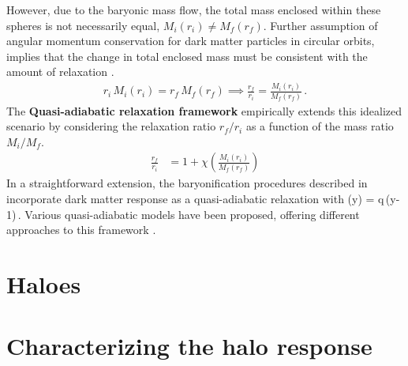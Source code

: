 However, due to the baryonic mass flow, the total mass enclosed within these spheres is not necessarily equal, \( M_i(r_i) \neq M_f(r_f) \). Further assumption of angular momentum conservation for dark matter particles in circular orbits, implies that the change in total enclosed mass must be consistent with the amount of relaxation \citep[][]{1986ApJ...301...27B}.
\begin{align}
    r_i \,M_i(r_i) = r_f \,M_f(r_f) %
    \implies 
    \frac{r_f}{r_i} = \frac{M_i(r_i)}{M_f(r_f)}\,. 
\label{eq:AR}
\end{align}
% 
The \textbf{Quasi-adiabatic relaxation framework} empirically extends this idealized scenario by considering the relaxation ratio \( r_f/r_i \) as a function of the mass ratio \( M_i/M_f \).
\begin{align}
\frac{r_f}{r_i} &= 1 + \chi \left( \frac{M_i(r_i)}{M_f(r_f)} \right) 
\label{eq:qAR}
\end{align}
In a straightforward extension, the baryonification procedures described in \cite{2015JCAP...12..049S,2021MNRAS.503.4147P} incorporate dark matter response as a quasi-adiabatic relaxation with 
\be
\chi(y) = q\,(y-1)\,.
\label{eq:chi-linear}
\ee
Various quasi-adiabatic models have been proposed, offering different approaches to this framework \citep{2010MNRAS.407..435A,2004ApJ...616...16G,2023Velmani&Paranjape}.


\section{Haloes}

\section{Characterizing the halo response}